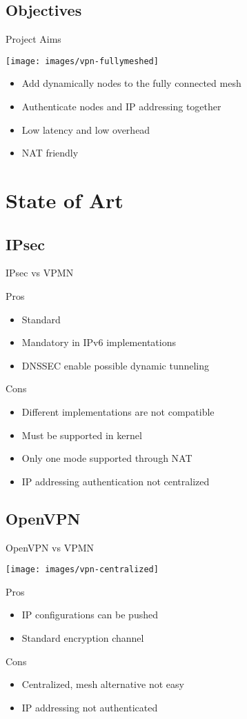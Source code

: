 \documentclass{beamer}
\newcommand*{\comparativeframe}[5]{
\begin{frame}{#1}
	#2
	\begin{exampleblock}{Pros}
		\begin{itemize}
		#3
		\end{itemize}
	\end{exampleblock}
	\begin{alertblock}{Cons}
		\begin{itemize}
		#4
		\end{itemize}
	\end{alertblock}
	#5
\end{frame}
}
\begin{document}
\subsection*{Objectives}
\begin{frame}{Project Aims}
	\begin{center}
	\texttt{[image: images/vpn-fullymeshed]}
	\end{center}
	\begin{itemize}
	\item Add dynamically nodes to the fully connected mesh
	\item Authenticate nodes and IP addressing together
	\item Low latency and low overhead
	\item NAT friendly
	\end{itemize}
\end{frame}

\section{State of Art}
\subsection{IPsec}
\comparativeframe{IPsec vs VPMN}{}
{%
\item Standard
\item Mandatory in IPv6 implementations
\item DNSSEC enable possible dynamic tunneling
}{%
\item Different implementations are \alert{not compatible}
\item Must be supported in kernel
\item Only one mode supported through NAT
\item IP addressing authentication not centralized
}{}
\subsection{OpenVPN}
\comparativeframe{OpenVPN vs VPMN}
{\begin{center}
\texttt{[image: images/vpn-centralized]}
\end{center}}
{%
\item IP configurations can be pushed
\item Standard encryption channel
}{%
\item Centralized, mesh alternative not easy
\item IP addressing not authenticated
}{}
\end{document}
